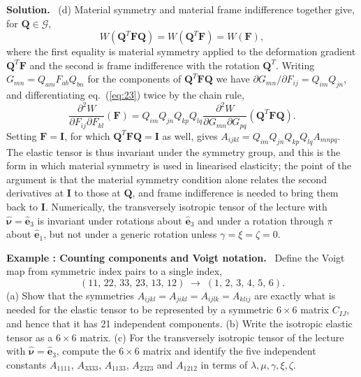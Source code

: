 \documentclass[a4paper,12pt]{paper}
\newcounter{example}
\renewenvironment{example}[1]{%
  \refstepcounter{example}%
  \begin{mdframed}[linewidth=1pt,innertopmargin=6pt,innerbottommargin=6pt]%
  \noindent\textbf{Example \theexample: #1.}\ }{%
  \end{mdframed}}
\newenvironment{solution}{\par\noindent\textbf{Solution.}\ }{\par\medskip}
\begin{document}
\begin{solution}
(d) Material symmetry and material frame indifference together give, for $\mathbf{Q}\in\mathcal{G}$,
\begin{equation}
W(\mathbf{Q}^{T}\mathbf{F}\mathbf{Q})=W(\mathbf{Q}^{T}\mathbf{F})=W(\mathbf{F}),
\label{eq:23}
\end{equation}
where the first equality is material symmetry applied to the deformation gradient
$\mathbf{Q}^{T}\mathbf{F}$ and the second is frame indifference with the rotation $\mathbf{Q}^{T}$.
Writing $G_{mn}=Q_{am}F_{ab}Q_{bn}$ for the components of $\mathbf{Q}^{T}\mathbf{F}\mathbf{Q}$ we have
$\partial G_{mn}/\partial F_{ij}=Q_{im}Q_{jn}$, and differentiating eq.~(\ref{eq:23})
twice by the chain rule,
\begin{equation}
\frac{\partial^{2}W}{\partial F_{ij}\partial F_{kl}}(\mathbf{F})
=Q_{im}Q_{jn}Q_{kp}Q_{lq}\frac{\partial^{2}W}{\partial G_{mn}\partial G_{pq}}(\mathbf{Q}^{T}\mathbf{F}\mathbf{Q}).
\label{eq:24}
\end{equation}
Setting $\mathbf{F}=\mathbf{I}$, for which $\mathbf{Q}^{T}\mathbf{F}\mathbf{Q}=\mathbf{I}$ as well,
gives $A_{ijkl}=Q_{im}Q_{jn}Q_{kp}Q_{lq}A_{mnpq}$. The elastic tensor is thus invariant under the
symmetry group, and this is the form in which material symmetry is used in linearised elasticity;
the point of the argument is that the material symmetry condition alone relates the second
derivatives at $\mathbf{I}$ to those at $\mathbf{Q}$, and frame indifference is needed to bring
them back to $\mathbf{I}$. Numerically, the transversely isotropic tensor of the lecture with
$\hat{\bm{\nu}}=\hat{\mathbf{e}}_{3}$ is invariant under rotations about $\hat{\mathbf{e}}_{3}$ and
under a rotation through $\pi$ about $\hat{\mathbf{e}}_{1}$, but not under a generic rotation
unless $\gamma=\xi=\zeta=0$.
\end{solution}

\begin{example}{Counting components and Voigt notation}
Define the Voigt map from symmetric index pairs to a single index,
\begin{equation}
(11,\,22,\,33,\,23,\,13,\,12)\;\longrightarrow\;(1,\,2,\,3,\,4,\,5,\,6).
\label{eq:25}
\end{equation}
(a) Show that the symmetries $A_{ijkl}=A_{jikl}=A_{ijlk}=A_{klij}$ are exactly what is needed for
the elastic tensor to be represented by a symmetric $6\times6$ matrix $C_{IJ}$, and hence that it
has 21 independent components. (b) Write the isotropic elastic tensor as a $6\times6$ matrix.
(c) For the transversely isotropic tensor of the lecture with $\hat{\bm{\nu}}=\hat{\mathbf{e}}_{3}$,
compute the $6\times6$ matrix and identify the five independent constants
$A_{1111}$, $A_{3333}$, $A_{1133}$, $A_{2323}$ and $A_{1212}$ in terms of $\lambda,\mu,\gamma,\xi,\zeta$.
\end{example}
\end{document}
